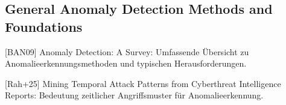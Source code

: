 \subsection{General Anomaly Detection Methods and Foundations}


    [BAN09] Anomaly Detection: A Survey: Umfassende Übersicht zu Anomalieerkennungsmethoden und typischen Herausforderungen.

    [Rah+25] Mining Temporal Attack Patterns from Cyberthreat Intelligence Reports: Bedeutung zeitlicher Angriffsmuster für Anomalieerkennung.

